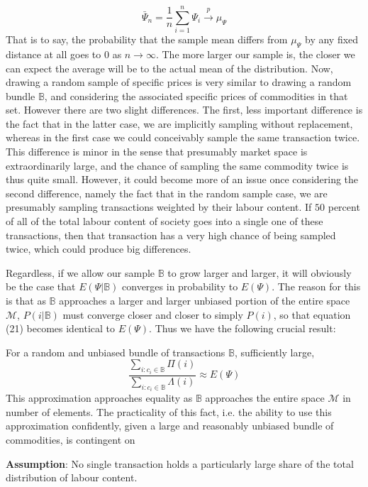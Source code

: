 \[ \bar{\Psi}_n = \frac{1}{n}\sum_{i =1}^n \Psi_i \overset{p}{\to} \mu_{\Psi} \]
That is to say, the probability that the sample mean differs from $\mu_{\Psi}$ by any fixed distance at all goes to $0$ as $n \to \infty$. The more larger our sample is, the closer we can expect the average will be to the actual mean of the distribution. Now, drawing a random sample of specific prices is very similar to drawing a random bundle $\mathbb{B}$, and considering the associated specific prices of commodities in that set. However there are two slight differences. The first, less important difference is the fact that in the latter case, we are implicitly sampling without replacement, whereas in the first case we could conceivably sample the same transaction twice. This difference is minor in the sense that presumably market space is extraordinarily large, and the chance of sampling the same commodity twice is thus quite small. However, it could become more of an issue once considering the second difference, namely the fact that in the random sample case, we are presumably sampling transactions weighted by their labour content. If $50$ percent of all of the total labour content of society goes into a single one of these transactions, then that transaction has a very high chance of being sampled twice, which could produce big differences. \par 
Regardless, if we allow our sample $\mathbb{B}$ to grow larger and larger, it will obviously be the case that $E(\Psi|\mathbb{B})$ converges in probability to $E(\Psi)$. The reason for this is that as $\mathbb{B}$ approaches a larger and larger unbiased portion of the entire space $\mathcal{M}$, $P(i|\mathbb{B})$ must converge closer and closer to simply $P(i)$, so that equation (21) becomes identical to $E(\Psi)$. Thus we have the following crucial result:
\begin{fact}
	For a random and unbiased bundle of transactions $\mathbb{B}$, sufficiently large,
	\[ \frac{\sum_{i: c_i \in \mathbb{B}} \Pi(i)}{\sum_{i: c_i \in \mathbb{B}} \Lambda(i)} \approx E(\Psi) \]
This approximation approaches equality as $\mathbb{B}$ approaches the entire space $\mathcal{M}$ in number of elements. The practicality of this fact, i.e. the ability to use this approximation confidently, given a large and reasonably unbiased bundle of commodities, is contingent on 
\begin{center}
	\textbf{Assumption}: No single transaction holds a particularly large share of the total distribution of labour content.  
\end{center}
\end{fact}
